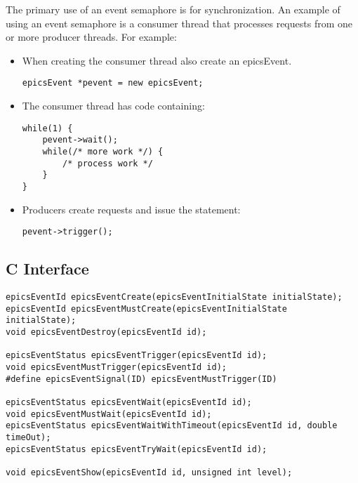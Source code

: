 The primary use of an event semaphore is for synchronization.
An example of using an event semaphore is a consumer thread that processes requests from one or more producer threads.
For example:

\begin{itemize}
\item When creating the consumer thread also create an epicsEvent.

\begin{verbatim}
epicsEvent *pevent = new epicsEvent;
\end{verbatim}

\item The consumer thread has code containing:

\begin{verbatim}
while(1) {
    pevent->wait();
    while(/* more work */) {
        /* process work */
    }
}
\end{verbatim}

\item Producers create requests and issue the statement:

\begin{verbatim}
pevent->trigger();
\end{verbatim}

\end{itemize}

\subsection{C Interface}

\begin{verbatim}
epicsEventId epicsEventCreate(epicsEventInitialState initialState);
epicsEventId epicsEventMustCreate(epicsEventInitialState initialState);
void epicsEventDestroy(epicsEventId id);

epicsEventStatus epicsEventTrigger(epicsEventId id);
void epicsEventMustTrigger(epicsEventId id);
#define epicsEventSignal(ID) epicsEventMustTrigger(ID)

epicsEventStatus epicsEventWait(epicsEventId id);
void epicsEventMustWait(epicsEventId id);
epicsEventStatus epicsEventWaitWithTimeout(epicsEventId id, double timeOut);
epicsEventStatus epicsEventTryWait(epicsEventId id);

void epicsEventShow(epicsEventId id, unsigned int level);
\end{verbatim}

